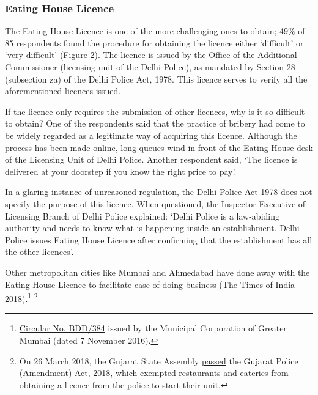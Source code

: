 \documentclass[a4paper, 12pt]{article}
\begin{document}
         
                   \subsubsection{Eating House Licence}
                   The Eating House Licence is one of the more challenging ones to obtain; 49\% of 85 respondents found the procedure for obtaining the licence either ‘difficult’ or ‘very difficult’ (Figure 2). The licence is issued by the Office of the Additional Commissioner (licensing unit of the Delhi Police), as mandated by Section 28 (subsection za) of the Delhi Police Act, 1978. This licence serves to verify all the aforementioned licences issued.
                   
                   If the licence only requires the submission of other licences, why is it so difficult to obtain? One of the respondents said that the practice of bribery had come to be widely regarded as a legitimate way of acquiring this licence. Although the process has 
been made online, long queues wind in front of the Eating House desk of the Licensing Unit of Delhi Police. Another respondent said, ‘The licence is delivered at your doorstep if you know the right price to pay’.
                   
                   In a glaring instance of unreasoned regulation, the Delhi Police Act 1978 does not specify the purpose of this licence. When questioned, the Inspector Executive of Licensing Branch of Delhi Police explained: ‘Delhi Police is a law-abiding authority and 
needs to know what is happening inside an establishment. Delhi Police issues Eating House Licence after confirming that the establishment has all the other licences’.
                   
                   Other metropolitan cities like Mumbai and Ahmedabad have done away with the Eating House Licence to facilitate ease of doing business (The Times of India 2018).\footnote{\href{https://bit.ly/2xiMwpL}{Circular No. BDD/384} issued by the Municipal 
Corporation of Greater Mumbai (dated 7 November 2016).} \footnote{On 26 March 2018, the Gujarat State Assembly \href{https://bit.ly/2xktGyu}{passed} the Gujarat Police (Amendment) Act, 2018, which exempted restaurants and eateries from obtaining a licence 
from the police to start their unit.}
                   
\end{document}
